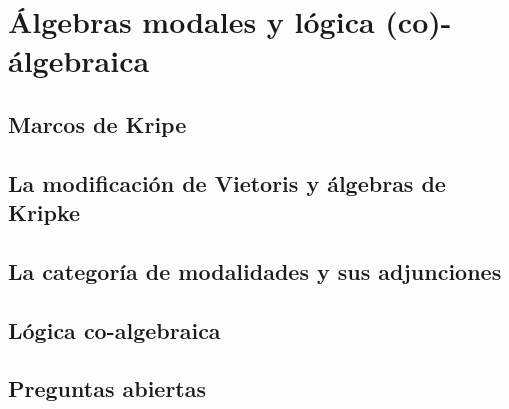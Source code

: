 \chapter{Álgebras modales y lógica (co)-álgebraica}
\section{Marcos de Kripe}
\section{La modificación de Vietoris y álgebras de Kripke}
\section{La categoría de modalidades y sus adjunciones}
\section{Lógica co-algebraica}
\section{Preguntas abiertas}